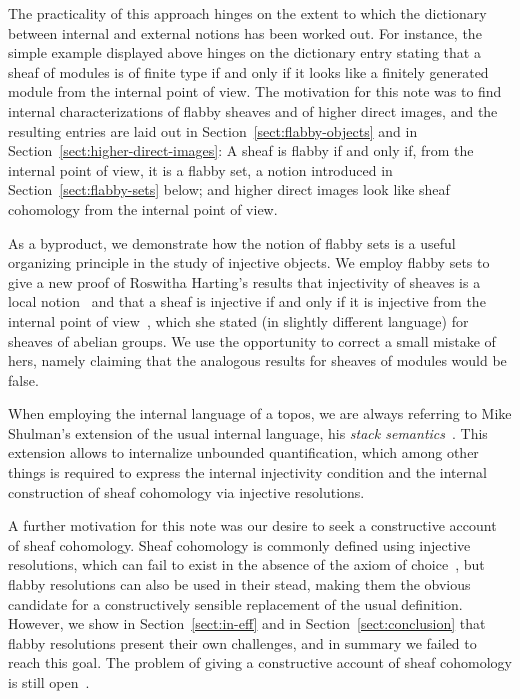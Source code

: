 \documentclass[oneside]{amsart}
\theoremstyle{definition}
\theoremstyle{plain}
\theoremstyle{remark}
\renewcommand{\_}{\mathpunct{.}\,}
\begin{document}
The practicality of this approach hinges on the extent to which the dictionary
between internal and external notions has been worked out. For instance, the
simple example displayed above hinges on the dictionary entry stating that a
sheaf of modules is of finite type if and only if it looks like a
finitely generated module from the internal point of view. The motivation for
this note was to find internal characterizations of flabby sheaves and of higher
direct images, and the resulting entries are laid out in
Section~\ref{sect:flabby-objects} and in
Section~\ref{sect:higher-direct-images}: A sheaf is flabby if and only if, from
the internal point of view, it is a flabby set, a notion introduced in
Section~\ref{sect:flabby-sets} below; and higher direct images look like sheaf
cohomology from the internal point of view.

As a byproduct, we demonstrate how the notion of flabby sets is a useful
organizing principle in the study of injective objects. We employ flabby sets
to give a new proof of Roswitha Harting's results that injectivity of sheaves is
a local notion~\cite{harting:remark} and that a sheaf is injective if and only
if it is injective from the internal point of
view~\cite{harting:locally-injective}, which she stated (in slightly different
language) for sheaves of abelian groups. We use the opportunity to correct a
small mistake of hers, namely claiming that the analogous results for sheaves of
modules would be false.

When employing the internal language of a topos, we are always referring to Mike Shulman's
extension of the usual internal language, his \emph{stack
semantics}~\cite{shulman:stack-semantics}. This extension allows to internalize
unbounded quantification, which among other things is required to express the
internal injectivity condition and the internal construction of sheaf
cohomology via injective resolutions.

A further motivation for this note was our desire to seek a constructive
account of sheaf cohomology. Sheaf cohomology is commonly defined using
injective resolutions, which can fail to exist in the absence of the axiom of
choice~\cite{blass:inj-proj-axc}, but flabby resolutions
can also be used in their stead, making them the obvious candidate for a
constructively sensible replacement of the usual definition. However, we show
in Section~\ref{sect:in-eff} and in Section~\ref{sect:conclusion} that flabby
resolutions present their own challenges, and in summary we failed to reach this
goal. The problem of giving a constructive account
of sheaf cohomology is still open~\cite{tenorio-mariano:cohomology}.
\end{document}
